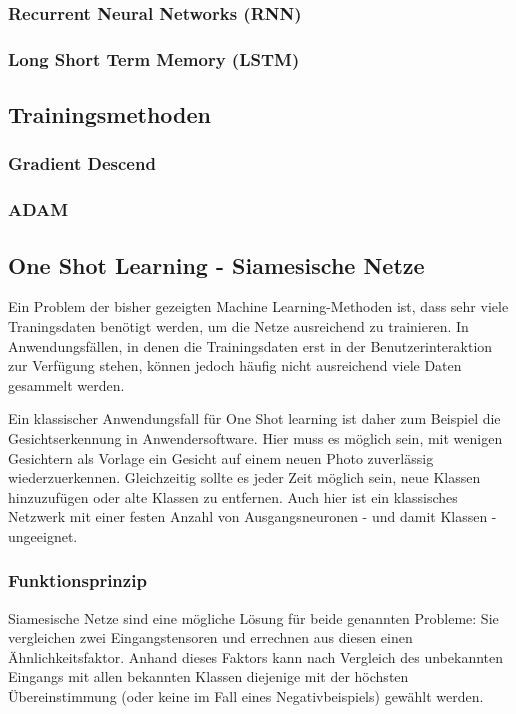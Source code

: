 		
		
		
		\subsubsection { Recurrent Neural Networks (RNN) }
		\subsubsection { Long Short Term Memory (LSTM) }
	
	\subsection { Trainingsmethoden }
		
		\subsubsection{Gradient Descend}
		\label{sec:gradient-descend}
		
		\subsubsection{ADAM}
		
	\subsection{ One Shot Learning - Siamesische Netze }
	Ein Problem der bisher gezeigten Machine Learning-Methoden ist, dass sehr viele Traningsdaten benötigt werden, um die Netze ausreichend zu trainieren. In Anwendungsfällen, in denen die Trainingsdaten erst in der Benutzerinteraktion zur Verfügung stehen, können jedoch häufig nicht ausreichend viele Daten gesammelt werden. 
	
	Ein klassischer Anwendungsfall für One Shot learning ist daher zum Beispiel die Gesichtserkennung in Anwendersoftware. Hier muss es möglich sein, mit wenigen Gesichtern als Vorlage ein Gesicht auf einem neuen Photo zuverlässig wiederzuerkennen. Gleichzeitig sollte es jeder Zeit möglich sein, neue Klassen hinzuzufügen oder alte Klassen zu entfernen. Auch hier ist ein klassisches Netzwerk mit einer festen Anzahl von Ausgangsneuronen - und damit Klassen - ungeeignet.

	\subsubsection{Funktionsprinzip}
		Siamesische Netze sind eine mögliche Lösung für beide genannten Probleme: Sie vergleichen zwei Eingangstensoren und errechnen aus diesen einen Ähnlichkeitsfaktor. Anhand dieses Faktors kann nach Vergleich des unbekannten Eingangs mit allen bekannten Klassen diejenige mit der höchsten Übereinstimmung (oder keine im Fall eines Negativbeispiels) gewählt werden.
		
